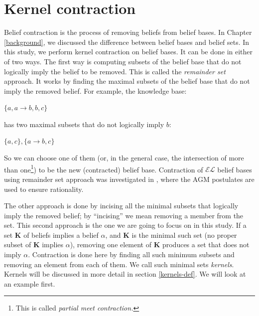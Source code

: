 \chapter{Kernel contraction}
\label{kernel}
Belief contraction is the process of removing beliefs from belief bases. In Chapter \ref{background}, we discussed the difference between belief bases and belief sets. In this study, we perform kernel contraction on belief bases. It can be done in either of two ways. The first way is computing subsets of the belief base that do not logically imply the belief to be removed. This is called the \textit{remainder set} approach. It works by finding the maximal subsets of the belief base that do not imply the removed belief. For example, the knowledge base:
\begin{center}
$\lbrace a, a \rightarrow b, b, c \rbrace$
\end{center}
has two maximal subsets that do not logically imply $b$:
\begin{center}
$\lbrace a, c\rbrace, \lbrace a \rightarrow b, c\rbrace$
\end{center}
So we can choose one of them (or, in the general case, the intersection of more than one\footnote{This is called \textit{partial meet contraction.}}) to be the new (contracted) belief base. Contraction of $\mathcal{EL}$ belief bases using remainder set approach was investigated in \cite{remainder}, where the AGM postulates are used to ensure rationality.


The other approach is done by incising all the minimal subsets that logically imply the removed belief; by ``incising'' we mean removing a member from the set. This second approach is the one we are going to focus on in this study. If a set \textbf{K} of beliefs implies a belief $\alpha$, and \textbf{K} is the minimal such set (no proper subset of \textbf{K} implies $\alpha$), removing one element of \textbf{K} produces a set that does not imply $\alpha$. Contraction is done here by finding all such minimum subsets and removing an element from each of them. We call such minimal sets \textit{kernels}. Kernels will be discussed in more detail in section \ref{kernels-def}. We will look at an example first.

